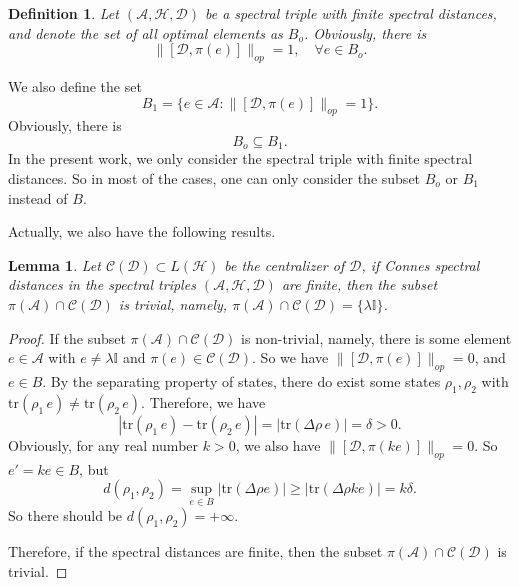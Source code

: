 \documentclass[a4paper,12pt]{article}
\newtheorem{definition}{Definition}
\newtheorem{lemma}{Lemma}
\begin{document}
\begin{definition}
  Let $(\mathcal{A}, \mathcal{H}, \mathcal{D})$ be a spectral triple with
  finite spectral distances, and denote the set of all optimal elements as
  $B_o$. Obviously, there is
  \begin{equation}
    \|[\mathcal{D}, \pi (e)]\|_{op} = 1, \quad \forall e \in B_o .
  \end{equation}
\end{definition}

We also define the set
\begin{equation}
  B_1 = \{e \in \mathcal{A}: \|[\mathcal{D}, \pi (e)]\|_{op} = 1\} .
\end{equation}
Obviously, there is
\begin{equation}
  B_o \subseteq B_1 .
\end{equation}
In the present work, we only consider the spectral triple with finite spectral
distances. So in most of the cases, one can only consider the subset $B_o$ or
$B_1$ instead of $B$.

Actually, we also have the following results.

\begin{lemma}\cite{Martinettip}
  Let $\mathcal{C} (\mathcal{D}) \subset L (\mathcal{H})$ be the centralizer
  of $\mathcal{D}$, if Connes spectral distances in the spectral triples
  $(\mathcal{A}, \mathcal{H}, \mathcal{D})$ are finite, then the subset $\pi
  (\mathcal{A}) \cap \mathcal{C} (\mathcal{D})$ is trivial, namely, $\pi
  (\mathcal{A}) \cap \mathcal{C} (\mathcal{D}) = \{\lambda \mathbb{I}\}$.
\end{lemma}

\begin{proof}
If the subset $\pi (\mathcal{A}) \cap \mathcal{C}
(\mathcal{D})$ is non-trivial, namely, there is some element $e \in
\mathcal{A}$ with $e \neq \lambda \mathbb{I}$ and $\pi (e) \in \mathcal{C}
(\mathcal{D})$. So we have $\|[\mathcal{D}, \pi (e)]\|_{op} = 0$, and $e \in
B$. By the separating property of states, there do exist some states $\rho_1,
\rho_2$ with $\mathrm{tr} (\rho_1  \, e) \neq \mathrm{tr} (\rho_2
\, e)$. Therefore, we have
\begin{equation}
  | \mathrm{tr} (\rho_1  \, e) - \mathrm{tr} (\rho_2 
  \, e) | = | \mathrm{tr} (\Delta \rho \, e) | =
  \delta > 0.
\end{equation}
Obviously, for any real number $k > 0$, we also have $\|[\mathcal{D}, \pi
(ke)]\|_{op} = 0$. So $e' = ke \in B$, but
\begin{equation}
  d (\rho_1, \rho_2) = \sup_{e\in B} | \mathrm{tr} (\Delta \rho e) |
  \geqslant | \mathrm{tr} (\Delta \rho ke) | = k \delta .
\end{equation}
So there should be $d (\rho_1, \rho_2) = + \infty$.

Therefore, if the spectral distances are finite, then the subset $\pi
(\mathcal{A}) \cap \mathcal{C} (\mathcal{D})$ is
trivial.
\end{proof}
\end{document}
